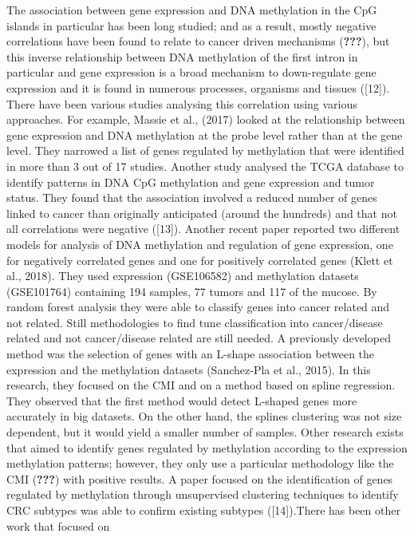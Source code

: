 \documentclass[10pt,letterpaper]{article}
\begin{document}
The association between gene expression and DNA methylation in the CpG
islands in particular has been long studied; and as a result, mostly
negative correlations have been found to relate to cancer driven
mechanisms (\textbf{???}), but this inverse relationship between DNA
methylation of the first intron in particular and gene expression is a
broad mechanism to down-regulate gene expression and it is found in
numerous processes, organisms and tissues ({[}12{]}). There have been
various studies analysing this correlation using various approaches. For
example, Massie et al., (2017) looked at the relationship between gene
expression and DNA methylation at the probe level rather than at the
gene level. They narrowed a list of genes regulated by methylation that
were identified in more than 3 out of 17 studies. Another study analysed
the TCGA database to identify patterns in DNA CpG methylation and gene
expression and tumor status. They found that the association involved a
reduced number of genes linked to cancer than originally anticipated
(around the hundreds) and that not all correlations were negative
({[}13{]}). Another recent paper reported two different models for
analysis of DNA methylation and regulation of gene expression, one for
negatively correlated genes and one for positively correlated genes
(Klett et al., 2018). They used expression (GSE106582) and methylation
datasets (GSE101764) containing 194 samples, 77 tumors and 117 of the
mucose. By random forest analysis they were able to classify genes into
cancer related and not related. Still methodologies to find tune
classification into cancer/disease related and not cancer/disease
related are still needed. A previously developed method was the
selection of genes with an L-shape association between the expression
and the methylation datasets (Sanchez-Pla et al., 2015). In this
research, they focused on the CMI and on a method based on spline
regression. They observed that the first method would detect L-shaped
genes more accurately in big datasets. On the other hand, the splines
clustering was not size dependent, but it would yield a smaller number
of samples. Other research exists that aimed to identify genes regulated
by methylation according to the expression methylation patterns;
however, they only use a particular methodology like the CMI
(\textbf{???}) with positive results. A paper focused on the
identification of genes regulated by methylation through unsupervised
clustering techniques to identify CRC subtypes was able to confirm
existing subtypes ({[}14{]}).There has been other work that focused on
\end{document}
